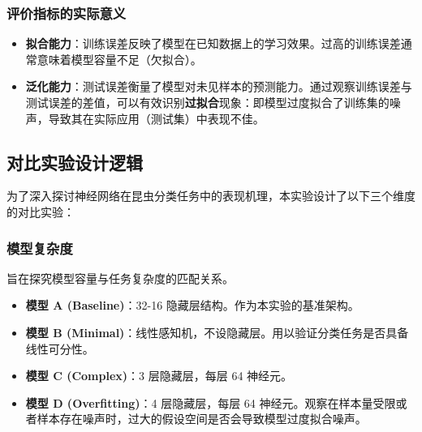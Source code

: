 \subsubsection{评价指标的实际意义}
\begin{itemize}
	\item \textbf{拟合能力}：训练误差反映了模型在已知数据上的学习效果。过高的训练误差通常意味着模型容量不足（欠拟合）。
	\item \textbf{泛化能力}：测试误差衡量了模型对未见样本的预测能力。通过观察训练误差与测试误差的差值，可以有效识别\textbf{过拟合}现象：即模型过度拟合了训练集的噪声，导致其在实际应用（测试集）中表现不佳。
\end{itemize}

\subsection{对比实验设计逻辑}
为了深入探讨神经网络在昆虫分类任务中的表现机理，本实验设计了以下三个维度的对比实验：

\subsubsection{模型复杂度}
旨在探究模型容量与任务复杂度的匹配关系。
\begin{itemize}
	\item \textbf{模型 A (Baseline)}：32-16 隐藏层结构。作为本实验的基准架构。
	\item \textbf{模型 B (Minimal)}：线性感知机，不设隐藏层。用以验证分类任务是否具备线性可分性。
	\item \textbf{模型 C (Complex)}：3 层隐藏层，每层 64 神经元。
	\item \textbf{模型 D (Overfitting)}：4 层隐藏层，每层 64 神经元。观察在样本量受限或者样本存在噪声时，过大的假设空间是否会导致模型过度拟合噪声。
\end{itemize}

